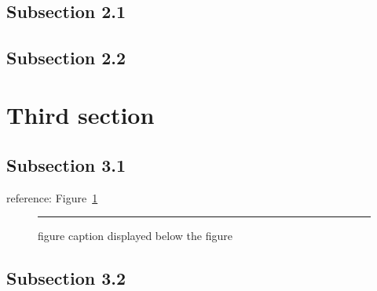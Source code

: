 \documentclass[12pt,english,seminar]{dbvstudentwork}
\begin{document}
  \blindtext~\cite{Doe12:TIA}


\subsection{Subsection 2.1}
\label{subsec:2.1}

  \Blindtext[2][2]


\subsection{Subsection 2.2}
\label{subsec:2.2}

  \Blindtext[2][2]


\section{Third section}
\label{sec:third}

  \blindtext


\subsection{Subsection 3.1}
\label{subsec:3.1}

  \Blindtext[2][2]

  reference: Figure~\ref{fig:myFigure}\newline

  \begin{figure}[tb]
    \centering
    \rule{4cm}{1cm}
    \caption[figure caption displayed in list of figures]{figure caption displayed below the figure}
    \label{fig:myFigure}
  \end{figure}


\subsection{Subsection 3.2}
\label{subsec:3.2}
\end{document}
